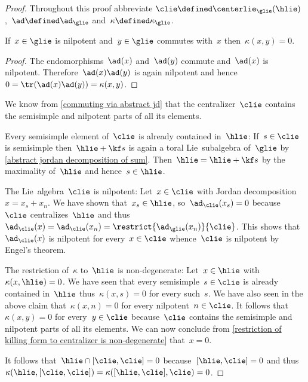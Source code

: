\begin{proof}
  Throughout this proof abbreviate $\clie \defined \centerlie_{\glie}(\hlie)$,~$\ad \defined \ad_{\glie}$ and~$\kappa \defined \kappa_{\glie}$.

  \begin{claim*}
    \label{technical and traceless}
    If~$x \in \glie$ is nilpotent and~$y \in \glie$ commutes with~$x$ then~$\kappa(x,y) = 0$.
  \end{claim*}
 
  \begin{proof}
    The endomorphisms~$\ad(x)$ and~$\ad(y)$ commute and~$\ad(x)$ is nilpotent.
    Therefore~$\ad(x)\ad(y)$ is again nilpotent and hence~$0 = \tr(\ad(x)\ad(y)) = \kappa(x,y)$.
  \end{proof}
 
  We know from \cref{commuting via abstract jd} that the centralizer~$\clie$ contains the semisimple and nilpotent parts of all its elements.
  
  Every semisimple element of~$\clie$ is already contained in~$\hlie$:
  If~$s \in \clie$ is semisimple then~$\hlie + \kf s$ is again a toral Lie~subalgebra of~$\glie$ by \cref{abstract jordan decomposition of sum}.
  Then~$\hlie = \hlie + \kf s$ by the maximality of~$\hlie$ and hence~$s \in \hlie$.
 
  The Lie~algebra~$\clie$ is nilpotent:
  Let~$x \in \clie$ with Jordan decomposition~$x = x_s + x_n$.
  We have shown that~$x_s \in \hlie$, so~$\ad_{\clie}(x_s) = 0$ because~$\clie$ centralizes~$\hlie$ and thus~$\ad_{\clie}(x) = \ad_{\clie}(x_n) = \restrict{\ad_{\glie}(x_n)}{\clie}$.
  This shows that~$\ad_{\clie}(x)$ is nilpotent for every~$x \in \clie$ whence~$\clie$ is nilpotent by Engel’s theorem.
 
  The restriction of~$\kappa$ to~$\hlie$ is non-degenerate:
  Let~$x \in \hlie$ with $\kappa(x, \hlie) = 0$.
  We have seen that every semisimple~$s \in \clie$ is already contained in~$\hlie$ thus~$\kappa(x,s) = 0$ for every such~$s$.
  We have also seen in the above claim that~$\kappa(x,n) = 0$ for every nilpotent~$n \in \clie$.
  It follows that~$\kappa(x,y) = 0$ for every~$y \in \clie$ because~$\clie$ contains the semisimple and nilpotent parts of all its elements.
  We can now conclude from \cref{restriction of killing form to centralizer is non-degenerate} that~$x = 0$.
  
  It follows that~$\hlie \cap [\clie,\clie] = 0$ because~$[\hlie,\clie] = 0$ and thus~$\kappa(\hlie, [\clie,\clie]) = \kappa([\hlie, \clie], \clie) = 0$.
  

\end{proof}
